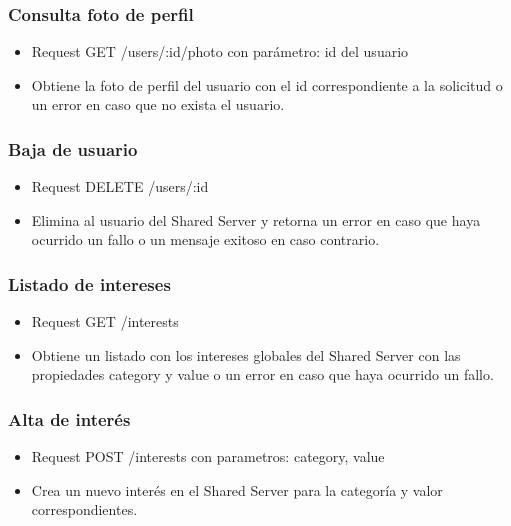 \documentclass[letterpaper,10pt,english]{sphinxmanual}
\begin{document}
\subsubsection{Consulta foto de perfil}
\label{manuals:consulta-foto-de-perfil}\begin{itemize}
\item {} 
Request GET /users/:id/photo con parámetro: id del usuario

\item {} 
Obtiene la foto de perfil del usuario con el id correspondiente a la solicitud o un error en caso que no exista el usuario.

\end{itemize}


\subsubsection{Baja de usuario}
\label{manuals:baja-de-usuario}\begin{itemize}
\item {} 
Request DELETE /users/:id

\item {} 
Elimina al usuario del Shared Server y retorna un error en caso que haya ocurrido un fallo o un mensaje exitoso en caso contrario.

\end{itemize}


\subsubsection{Listado de intereses}
\label{manuals:listado-de-intereses}\begin{itemize}
\item {} 
Request GET /interests

\item {} 
Obtiene un listado con los intereses globales del Shared Server con las propiedades category y value o un error en caso que haya ocurrido un fallo.

\end{itemize}


\subsubsection{Alta de interés}
\label{manuals:alta-de-interes}\begin{itemize}
\item {} 
Request POST /interests con parametros: category, value

\item {} 
Crea un nuevo interés en el Shared Server para la categoría y valor correspondientes.

\end{itemize}
\end{document}
